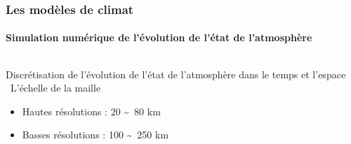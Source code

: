 \documentclass[aspectratio=169, usepdftitle=false, xcolor={dvipsnames}, 9pt,table]{beamer}
\begin{document}
\begin{frame}[c]
    \frametitle{Les modèles de climat}
    \framesubtitle{Simulation numérique de l'évolution de l'état de l'atmosphère}
    \begin{columns}
        \begin{column}{0.55\textwidth}
            \footnotesize
            \begin{definition} 
                Discrétisation de l'évolution de l'état de l'atmosphère dans le temps et \alert{l'espace}\\
                \rightarrow ~L'échelle de la \alert{maille}
            \end{definition}
            \vspace{1em}%
            \begin{block}
                \begin{itemize}
                    \item Hautes résolutions : 20 \sim~80 km
                    \item Basses résolutions : 100 \sim~250 km
                \end{itemize}
            \end{block}
            \vspace{1em}%
        \end{column}
\end{columns}
\end{frame}
\end{document}
